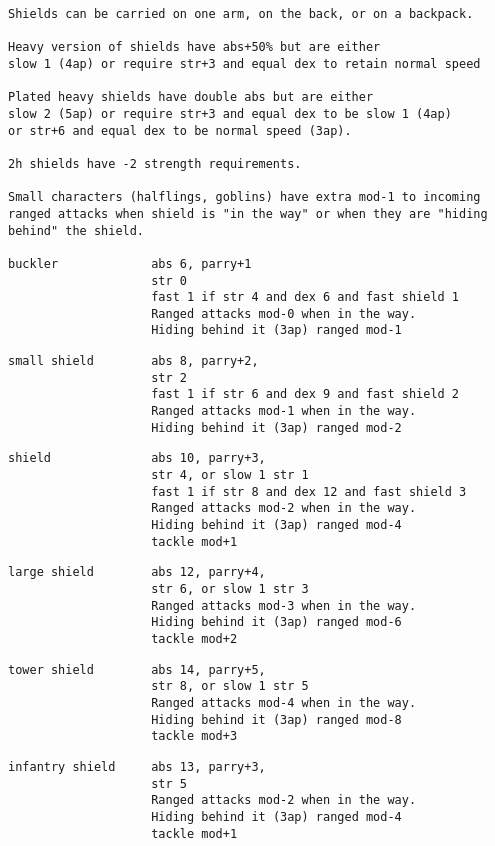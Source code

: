 \small \begin{samepage} \begin{verbatim}
Shields can be carried on one arm, on the back, or on a backpack.

Heavy version of shields have abs+50% but are either
slow 1 (4ap) or require str+3 and equal dex to retain normal speed

Plated heavy shields have double abs but are either
slow 2 (5ap) or require str+3 and equal dex to be slow 1 (4ap)
or str+6 and equal dex to be normal speed (3ap).

2h shields have -2 strength requirements.

Small characters (halflings, goblins) have extra mod-1 to incoming ranged attacks when shield is "in the way" or when they are "hiding behind" the shield.

buckler             abs 6, parry+1
                    str 0
                    fast 1 if str 4 and dex 6 and fast shield 1
                    Ranged attacks mod-0 when in the way.
                    Hiding behind it (3ap) ranged mod-1
\end{verbatim} \blocklistgap \begin{verbatim}
small shield        abs 8, parry+2,
                    str 2
                    fast 1 if str 6 and dex 9 and fast shield 2
                    Ranged attacks mod-1 when in the way.
                    Hiding behind it (3ap) ranged mod-2
\end{verbatim} \blocklistgap \begin{verbatim}
shield              abs 10, parry+3,
                    str 4, or slow 1 str 1
                    fast 1 if str 8 and dex 12 and fast shield 3
                    Ranged attacks mod-2 when in the way.
                    Hiding behind it (3ap) ranged mod-4
                    tackle mod+1
\end{verbatim} \blocklistgap \begin{verbatim}
large shield        abs 12, parry+4,
                    str 6, or slow 1 str 3
                    Ranged attacks mod-3 when in the way.
                    Hiding behind it (3ap) ranged mod-6
                    tackle mod+2
\end{verbatim} \blocklistgap \begin{verbatim}
tower shield        abs 14, parry+5,
                    str 8, or slow 1 str 5
                    Ranged attacks mod-4 when in the way.
                    Hiding behind it (3ap) ranged mod-8
                    tackle mod+3
\end{verbatim} \blocklistgap \begin{verbatim}
infantry shield     abs 13, parry+3,
                    str 5
                    Ranged attacks mod-2 when in the way.
                    Hiding behind it (3ap) ranged mod-4
                    tackle mod+1
\end{verbatim} \end{samepage} \normalsize \goodbreak

